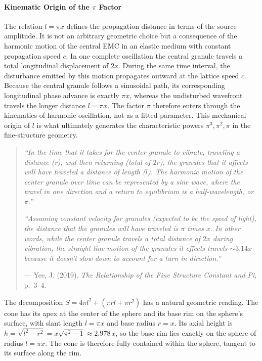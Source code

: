 \documentclass[10pt,a4paper]{article}
\begin{document}
\paragraph{Kinematic Origin of the \(\pi\) Factor}
The relation \(l = \pi x\) defines the propagation distance in terms of the source amplitude. It is not an arbitrary geometric choice but a consequence of the harmonic motion of the central EMC in an elastic medium with constant propagation speed \(c\). In one complete oscillation the central granule travels a total longitudinal displacement of \(2x\). During the same time interval, the disturbance emitted by this motion propagates outward at the lattice speed \(c\). Because the central granule follows a sinusoidal path, its corresponding longitudinal phase advance is exactly \(\pi x\), whereas the undisturbed wavefront travels the longer distance \(l = \pi x\). The factor \(\pi\) therefore enters through the kinematics of harmonic oscillation, not as a fitted parameter. This mechanical origin of \(l\) is what ultimately generates the characteristic powers \(\pi^{3}, \pi^{2}, \pi\) in the fine-structure geometry.

\begin{quote}
	\small
	\textit{``In the time that it takes for the center granule to vibrate, traveling a distance (r), and then returning (total of \(2r\)), the granules that it affects will have traveled a distance of length (\(l\)). The harmonic motion of the center granule over time can be represented by a sine wave, where the travel in one direction and a return to equilibrium is a half-wavelength, or \(\pi\).''}
	
	\vspace{3pt}
	
	\textit{``Assuming constant velocity for granules (expected to be the speed of light), the distance that the granules will have traveled is \(\pi\) times \(x\). In other words, while the center granule travels a total distance of \(2x\) during vibration, the straight-line motion of the granules it effects travels \(\sim 3.14x\) because it doesn't slow down to account for a turn in direction.''}
	
	\vspace{3pt}
	
	\hfill --- Yee, J. (2019). \textit{The Relationship of the Fine Structure Constant and Pi}, p.~3--4. \cite{Yee2019alfa}
\end{quote}

The decomposition $S = 4\pi l^2 + (\pi r l + \pi r^2)$ has a natural
geometric reading. The cone has its apex at the center of the sphere
and its base rim on the sphere's surface, with slant length
$l = \pi x$ and base radius $r = x$. Its axial height is
$h = \sqrt{l^2 - r^2} = x\sqrt{\pi^2 - 1} \approx 2.978\,x$, so the
base rim lies exactly on the sphere of radius $l = \pi x$. The cone is
therefore fully contained within the sphere, tangent to its surface
along the rim.
\end{document}
